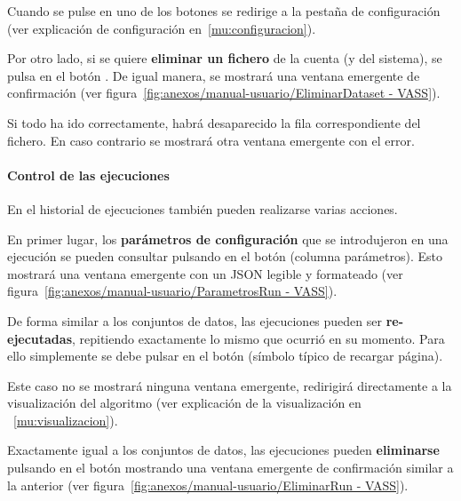 
Cuando se pulse en uno de los botones se redirige a la pestaña de configuración
(ver explicación de configuración en~\ref{mu:configuracion}).

\label{mu:eliminardataset}
Por otro lado, si se quiere \textbf{eliminar un fichero} de la cuenta (y del
sistema), se pulsa en el botón \button[vassred]{\faTrash}. De igual manera, se
mostrará una ventana emergente de confirmación (ver
figura~\ref{fig:anexos/manual-usuario/EliminarDataset - VASS}).


Si todo ha ido correctamente, habrá desaparecido la fila correspondiente del
fichero. En caso contrario se mostrará otra ventana emergente con el error.

\paragraph{Control de las ejecuciones} En el historial de ejecuciones también
pueden realizarse varias acciones.

\label{mu:parametrosrun}
En primer lugar, los \textbf{parámetros de configuración} que se introdujeron en
una ejecución se pueden consultar pulsando en el botón
\button[vassgreen]{\faFileTextO} (columna parámetros). Esto mostrará una ventana
emergente con un JSON legible y formateado (ver
figura~\ref{fig:anexos/manual-usuario/ParametrosRun - VASS}).


De forma similar a los conjuntos de datos, las ejecuciones pueden ser
\textbf{re-ejecutadas}, repitiendo exactamente lo mismo que ocurrió en su
momento. Para ello simplemente se debe pulsar en el botón
\button[vassgold]{\faRotateRight} (símbolo típico de recargar página).

Este caso no se mostrará ninguna ventana emergente, redirigirá directamente a la
visualización del algoritmo (ver explicación de la visualización en
~\ref{mu:visualizacion}).

\label{mu:eliminarrun}
Exactamente igual a los conjuntos de datos, las ejecuciones pueden
\textbf{eliminarse} pulsando en el botón \button[vassred]{\faTrash} mostrando
una ventana emergente de confirmación similar a la anterior (ver
figura~\ref{fig:anexos/manual-usuario/EliminarRun - VASS}).

